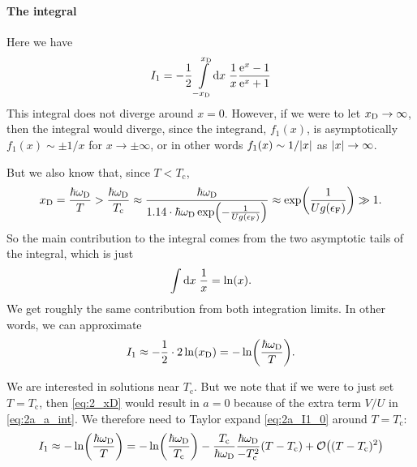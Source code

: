 \documentclass[11pt,letter, swedish, english
]{article}
\newcommand{\Tc}{\ensuremath{T_{\text{c}}}}
\newcommand{\eF}{\ensuremath{\epsilon_{\text{F}}}}
\newcommand{\wD}{\ensuremath{\omega_{\text{D}}}}
\begin{document}
\paragraph{The integral}
Here we have
\vspace{-11pt}\begin{equation}
I_1=-\frac{1}{2}\int_{-\xD}^{\xD}\!\rd{x}\;
\frac{1}{x}
\frac{\ee^x-1}{\ee^x+1}
\end{equation}
This integral does not diverge around $x=0$. However, if we were to let
$x_{\text{D}}\to\infty$, then the integral would diverge, since the integrand, $f_1(x)$,
is asymptotically $f_1(x)\sim\pm1/x$ for $x\to\pm\infty$, or in other
words $f_1(x)\sim1/\abs{x}$ as $\abs{x}\to\infty$. 

But we also know that, since $T<\Tc$,
\begin{equation}\label{eq:2_xD}
\xD=\frac{\hbar\wD}{T}>\frac{\hbar\wD}{\Tc}
\approx\frac{\hbar\wD}{1.14\cdot\hbar\wD\exp(-\frac{1}{Ug(\eF)})}
\approx\exp(\frac{1}{Ug(\eF)})\gg1.
\end{equation}
So the main contribution to the integral comes from the two
asymptotic tails of the integral, which is just
\begin{equation}
\int\rd{x}\;\frac{1}{x}=\ln(x).
\end{equation}
We get roughly the same contribution from both integration limits.
In other words, we can approximate
\begin{equation}\label{eq:2a_I1_0}
I_1\approx -\frac{1}{2}\cdot2\ln(\xD)=-\ln(\frac{\hbar\wD}{T}).
\end{equation}

We are interested in solutions near $\Tc$. But we note that if we were
to just set $T=\Tc$, then \eqref{eq:2_xD} would result in $a=0$
because of the extra term $V/U$ in \eqref{eq:2a_a_int}. We therefore
need to Taylor expand \eqref{eq:2a_I1_0} around $T=\Tc$:
\begin{equation}
I_1\approx-\ln(\frac{\hbar\wD}{T})
=-\ln(\frac{\hbar\wD}{\Tc}) -
\frac{\Tc}{\hbar\wD}\frac{\hbar\wD}{-\Tc^2} (T-\Tc)
+\order{(T-\Tc)^2}
\end{equation}

\end{document}
